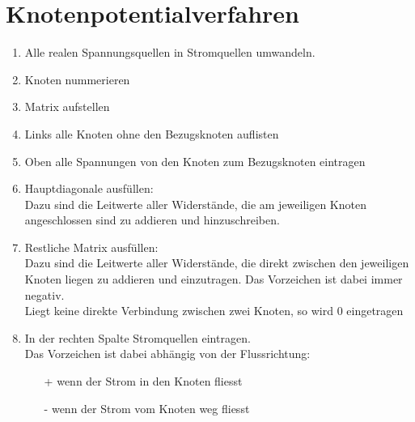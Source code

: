 



\section{Knotenpotentialverfahren}
\begin{enumerate}
  \item Alle realen Spannungsquellen in Stromquellen umwandeln. 
  \item Knoten nummerieren
  \item Matrix aufstellen
  \item Links alle Knoten ohne den Bezugsknoten auflisten
  \item Oben alle Spannungen von den Knoten zum Bezugsknoten eintragen
  \item Hauptdiagonale ausfüllen: \\
  Dazu sind die Leitwerte aller Widerstände, die am jeweiligen Knoten angeschlossen sind zu addieren und hinzuschreiben. 
  \item Restliche Matrix ausfüllen: \\
  Dazu sind die Leitwerte aller Widerstände, die direkt zwischen den jeweiligen Knoten liegen zu addieren und einzutragen. Das Vorzeichen ist dabei immer negativ. \\
  Liegt keine direkte Verbindung zwischen zwei Knoten, so wird 0 eingetragen
  \item In der rechten Spalte Stromquellen eintragen. \\
  Das Vorzeichen ist dabei abhängig von der Flussrichtung: \\
  \begin{itemize}
    \item[+] wenn der Strom in den Knoten fliesst
    \item[-] wenn der Strom vom Knoten weg fliesst
  \end{itemize}
\end{enumerate}

